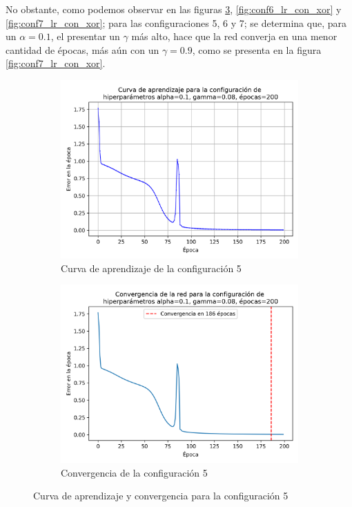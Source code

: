 \documentclass{article}
\begin{document}
No obstante, como podemos observar en las figuras  \ref{fig:conf5_lr_con_xor}, \ref{fig:conf6_lr_con_xor} y \ref{fig:conf7_lr_con_xor}; para las configuraciones 5, 6 y 7; se determina que, para un $\alpha=0.1$, el presentar un $\gamma$ más alto, hace que la red converja en una menor cantidad de épocas, más aún con un $\gamma=0.9$, como se presenta en la figura \ref{fig:conf7_lr_con_xor}.
\begin{figure}[h!]
    \centering
    \begin{subfigure}{0.49\textwidth}
        \includegraphics[width= \textwidth]{imgs/XOR/configs/curva_aprendizaje_alpha_0.1_gamma_0.08_epochs_200.png}
        \caption{Curva de aprendizaje de la configuración 5}
        \label{fig:conf_5_xor_lr}
    \end{subfigure}
    \hfill
    \begin{subfigure}{0.49\textwidth}
        \includegraphics[width=\linewidth]{imgs/XOR/configs/convergencia_alpha_0.1_gamma_0.08_epochs_200.png}
        \caption{Convergencia de la configuración 5}
        \label{fig:conf5_xor_con}
    \end{subfigure}
    \caption{Curva de aprendizaje y convergencia para la configuración 5}
    \label{fig:conf5_lr_con_xor}
\end{figure}
\end{document}
